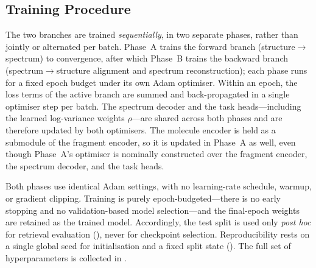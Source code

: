 \subsection{Training Procedure}
\label{sec:training-procedure}

The two branches are trained \emph{sequentially}, in two separate phases, rather than jointly or alternated per batch. Phase~A trains the forward branch (structure$\rightarrow$spectrum) to convergence, after which Phase~B trains the backward branch (spectrum$\rightarrow$structure alignment and spectrum reconstruction); each phase runs for a fixed epoch budget under its own Adam optimiser. 
Within an epoch, the loss terms of the active branch are summed and back-propagated in a single optimiser step per batch. 
The spectrum decoder and the task heads---including the learned log-variance weights $\rho$---are shared across both phases and are therefore updated by both optimisers. 
The molecule encoder is held as a submodule of the fragment encoder, so it is updated in Phase~A as well, even though Phase~A's optimiser is nominally constructed over the fragment encoder, the spectrum decoder, and the task heads.

Both phases use identical Adam settings, with no learning-rate schedule, warmup, or gradient clipping. 
Training is purely epoch-budgeted---there is no early stopping and no validation-based model selection---and the final-epoch weights are retained as the trained model. 
Accordingly, the test split is used only \emph{post hoc} for retrieval evaluation (), never for checkpoint selection.
Reproducibility rests on a single global seed for initialisation and a fixed split state (). The full set of hyperparameters is collected in .
